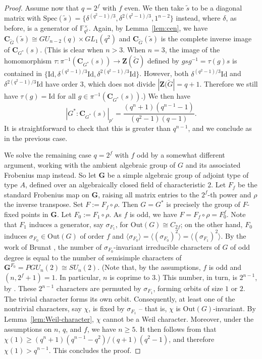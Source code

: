 \documentclass[12pt]{amsart}
\theoremstyle{plain}
\theoremstyle{definition}
\numberwithin{equation}{section}
\newcommand{\FF}{\mathbb{F}}
\newcommand{\bG}{\mathbf{G}}
\newcommand{\Out}{{\mathrm {Out}}}
\newcommand{\Spec}{{\mathrm {Spec}}}
\newcommand{\bC}{{\mathbf{C}}}
\newcommand{\bZ}{{\mathbf{Z}}}
\begin{document}
\begin{proof}
Assume now that $q=2^f$ with $f$ even. We then take $\widetilde{s}$
to be a diagonal matrix with
$\Spec(\widetilde{s})=\{\delta^{(q^2-1)/3},
\delta^{2(q^2-1)/3},1^{n-2}\}$ instead, where $\delta$, as before,
is a generator of $\FF_{q^2}^\times$. Again, by Lemma~\ref{lem:cen},
we have $\bC_{\widetilde{G}}(\widetilde{s})\cong GU_{n-2}(q)\times
GL_1(q^2)$ and $\bC_{\widetilde{G}}(\widetilde{s})$ is the complete
inverse image of $\bC_{G^*}(s)$. (This is clear when $n>3$. When
$n=3$, the image of the homomorphism $\tau:
\pi^{-1}(\bC_{G^*}(s))\to \bZ(\widetilde{G})$ defined by
$gsg^{-1}=\tau(g)s$ is contained in $\{\mathrm{Id},
\delta^{(q^2-1)/3}\mathrm{Id}, \delta^{2(q^2-1)/3}\mathrm{Id}\}$.
However, both $\delta^{(q^2-1)/3}\mathrm{Id}$ and
$\delta^{2(q^2-1)/3}\mathrm{Id}$ have order $3$, which does not
divide $|\bZ(\widetilde{G}|=q+1$. Therefore we still have
$\tau(g)=\mathrm{Id}$ for all $g\in \pi^{-1}(\bC_{G^*}(s))$.) We
then have
\[
|G^*:\bC_{G^*}(s)|_{p'}=\frac{(q^n+1)(q^{n-1}-1)}{(q^2-1)(q-1)}.
\]
It is straightforward to check that this is greater than $q^{n-1}$,
and we conclude as in the previous case.

We solve the remaining case $q=2^f$ with $f$ odd by a somewhat
different argument, working with the ambient algebraic group of $G$
and its associated Frobenius map instead. So let $\bG$ be a simple
algebraic group of adjoint type of type $A$, defined over an
algebraically closed field of characteristic $2$. Let $F_f$ be the
standard Frobenius map on $\bG$, raising all matrix entries to the
$2^f$-th power and $\rho$ the inverse transpose. Set
$F:=F_f\circ\rho$. Then $G=G^*$ is precisely the group of $F$-fixed
points in $\bG$. Let $F_0:=F_1\circ\rho$. As $f$ is odd, we have
$F=F_f\circ\rho=F_0^f$. Note that $F_1$ induces a generator, say
$\sigma_{F_1}$, for $\Out(G)\cong C_{2f}$; on the other hand, $F_0$
induces $\sigma_{F_0}\in\Out(G)$ of order $f$ and $\langle
\sigma_{F_0}\rangle=\langle (\sigma_{F_0})^2\rangle=\langle
(\sigma_{F_1})^2\rangle$. By the work of Brunat
\cite[Proposition~2]{Brunat09}, the number of
$\sigma_{F_0}$-invariant irreducible characters of $G$ of odd degree
is equal to the number of semisimple characters of
$\bG^{F_0}=PGU_n(2)\cong SU_n(2)$. (Note that, by the assumptions,
$f$ is odd and $(n,2^f+1)=1$. In particular, $n$ is coprime to $3$.)
This number, in turn, is $2^{n-1}$, by
\cite[Corollary~8.3.6]{Carter85}. These $2^{n-1}$ characters are
permuted by $\sigma_{F_1}$, forming orbits of size $1$ or $2$. The
trivial character forms its own orbit. Consequently, at least one of
the nontrivial characters, say $\chi$, is fixed by $\sigma_{F_1}$ --
that is, $\chi$ is $\Out(G)$-invariant. By
Lemma~\ref{lem:Weil-character}, $\chi$ cannot be a Weil character.
Moreover, under the assumptions on $n$, $q$, and $f$, we have $n
\geq 5$. It then follows from \cite[Table~V]{TZ96} that $\chi(1)\geq
(q^n+1)(q^{n-1}-q^2)/(q+1)(q^2-1)$, and therefore $\chi(1)>q^{n-1}$.
This concludes the proof.
\end{proof}
\end{document}
